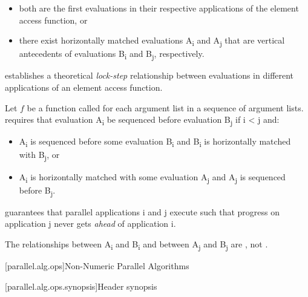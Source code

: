 \begin{itemize}
\item both are the first evaluations in their respective applications of the element access function, or
\item there exist horizontally matched evaluations A\textsubscript{i} and A\textsubscript{j} that are vertical antecedents of evaluations B\textsubscript{i} and B\textsubscript{j}, respectively.
\end{itemize}

\begin{note} establishes a theoretical {\em lock-step} relationship between evaluations in different applications of an element access function.\end{note}

\pnum Let $f$ be a function called for each argument list in a sequence of argument lists.  requires that evaluation A\textsubscript{i} be sequenced before evaluation B\textsubscript{j} if i < j and:

\begin{itemize}
\item A\textsubscript{i} is sequenced before some evaluation B\textsubscript{i} and B\textsubscript{i} is horizontally matched with B\textsubscript{j}, or
\item A\textsubscript{i} is horizontally matched with some evaluation A\textsubscript{j} and A\textsubscript{j} is sequenced before B\textsubscript{j}.
\end{itemize}

\begin{note}
 guarantees that parallel applications i and j execute such that progress on application j never gets {\em ahead} of application i.
\end{note}
\begin{note}
The relationships between A\textsubscript{i} and B\textsubscript{i} and between A\textsubscript{j} and B\textsubscript{j} are , not .
\end{note}

[parallel.alg.ops]{Non-Numeric Parallel Algorithms}

[parallel.alg.ops.synopsis]{Header  synopsis}


